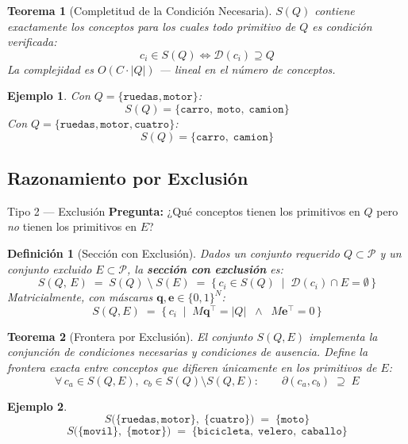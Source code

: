 \documentclass[12pt]{article}
\newtheorem{theorem}{Teorema}[section]
\newtheorem{definition}{Definición}[section]
\newtheorem{example}{Ejemplo}[section]
\begin{document}
\begin{theorem}[Completitud de la Condición Necesaria]
	$S(Q)$ contiene exactamente los conceptos para los cuales todo primitivo de $Q$
	es condición verificada:
	\[
	c_i \in S(Q) \iff \mathcal{D}(c_i) \supseteq Q
	\]
	La complejidad es $O(C \cdot |Q|)$ — lineal en el número de conceptos.
\end{theorem}

\begin{example}
	Con $Q = \{\texttt{ruedas},\texttt{motor}\}$:
	\[
	S(Q) = \{\texttt{carro},\;\texttt{moto},\;\texttt{camion}\}
	\]
	Con $Q = \{\texttt{ruedas},\texttt{motor},\texttt{cuatro}\}$:
	\[
	S(Q) = \{\texttt{carro},\;\texttt{camion}\}
	\]
\end{example}

\subsection{Razonamiento por Exclusión}

\begin{razonbox}{Tipo 2 — Exclusión}
	\textbf{Pregunta:} ¿Qué conceptos tienen los primitivos en $Q$ pero \emph{no}
	tienen los primitivos en $E$?
\end{razonbox}

\begin{definition}[Sección con Exclusión]
	Dados un conjunto requerido $Q \subset \mathcal{P}$ y un conjunto excluido
	$E \subset \mathcal{P}$, la \textbf{sección con exclusión} es:
	\[
	S(Q,\,E) \;=\; S(Q) \;\setminus\; S(E)
	\;=\; \bigl\{\,c_i \in S(Q)
	\;\mid\; \mathcal{D}(c_i) \cap E = \emptyset\,\bigr\}
	\]
	Matricialmente, con máscaras $\mathbf{q},\mathbf{e} \in \{0,1\}^N$:
	\[
	S(Q,E) \;=\; \bigl\{\,c_i
	\;\mid\; M\mathbf{q}^\top = |Q|
	\;\;\wedge\;\;
	M\mathbf{e}^\top = 0\,\bigr\}
	\]
\end{definition}

\begin{theorem}[Frontera por Exclusión]
	El conjunto $S(Q,E)$ implementa la conjunción de condiciones necesarias y
	condiciones de ausencia. Define la frontera exacta entre conceptos que
	difieren únicamente en los primitivos de $E$:
	\[
	\forall\, c_a \in S(Q,E),\; c_b \in S(Q) \setminus S(Q,E):
	\qquad
	\partial(c_a, c_b) \;\supseteq\; E
	\]
\end{theorem}

\begin{example}
	\[
	S\!\bigl(\{\texttt{ruedas},\texttt{motor}\},\;\{\texttt{cuatro}\}\bigr)
	\;=\; \{\texttt{moto}\}
	\]
	\[
	S\!\bigl(\{\texttt{movil}\},\;\{\texttt{motor}\}\bigr)
	\;=\; \{\texttt{bicicleta},\;\texttt{velero},\;\texttt{caballo}\}
	\]
\end{example}
\end{document}

